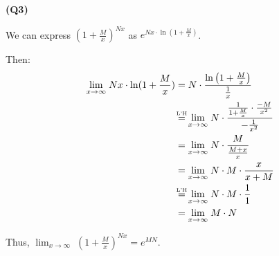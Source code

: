 \documentclass[12pt, a4paper]{article}
\newcommand{\displim}[1]{\displaystyle{\lim_{#1}}}
\newcommand{\inflim}{\displim{x \to \infty}\;}
\newcommand\lheq{\stackrel{\mathclap{\mbox{\tiny{L'H}}}}{=}}
\begin{document}
\textbf{(Q3)}

We can express $\left(1 + \frac{M}{x}\right)^{Nx}$ as $e^{Nx \cdot \ln(1 + \frac{M}{x})}$.

Then: \begin{align*}
    \inflim Nx \cdot \ln(1 + \frac{M}{x}) & = N \cdot \frac{\ln\left(1 + \frac{M}{x}\right)}{\frac{1}{x}}\\
    & \lheq \inflim N \cdot
    \frac{\frac{1}{1 + \frac{M}{x}} \cdot \frac{-M}{x^2}}{-\frac{1}{x^2}}\\
    & = \inflim N \cdot \frac{M}{\frac{M + x}{x}}\\
    & = \inflim N \cdot M \cdot \frac{x}{x + M}\\
    & \lheq \inflim N \cdot M \cdot \frac{1}{1}\\
    & = \inflim M \cdot N
\end{align*}

Thus, $\inflim \left(1 + \frac{M}{x}\right)^{Nx} = e^{MN}$.
\end{document}
